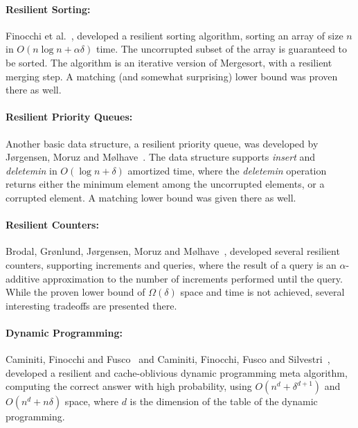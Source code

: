 \documentclass{llncs}
\begin{document}
\paragraph{Resilient Sorting:}

	Finocchi et al.~\cite{resilient_data_structures,resilient_sorting},
	developed a resilient sorting algorithm,
	sorting an array of size $n$ in $O(n\log n + \alpha\delta)$ time.
	The uncorrupted subset of the array is guaranteed to be sorted.
	The algorithm is an iterative version of Mergesort,
	with a resilient merging step.
	A matching (and somewhat surprising) lower bound
	was proven there as well.
	
\paragraph{Resilient Priority Queues:}

	Another basic data structure, a resilient priority queue,
	was developed by J{\o}rgensen, Moruz and M{\o}lhave~\cite{resilient_priority_queues}.
	The data structure supports \emph{insert} and \emph{deletemin} in $O(\log n + \delta)$ amortized time,
	where the \emph{deletemin} operation returns either the minimum element among the uncorrupted elements,
	or a corrupted element.
	A matching lower bound was given there as well.	
		
\paragraph{Resilient Counters:}

	Brodal, Gr{\o}nlund, J{\o}rgensen, Moruz and \linebreak M{\o}lhave~\cite{resilient_counters},
	developed several resilient counters,
	supporting increments and queries,
	where the result of a query is an $\alpha$-additive approximation
	to the number of increments performed until the query.
	While the proven lower bound of $\Omega(\delta)$ space and time
	is not achieved, several interesting tradeoffs are presented there.

\paragraph{Dynamic Programming:}	
	
	Caminiti, Finocchi and Fusco~\cite{first_dynamic_programming}
	and Caminiti, Finocchi, Fusco and Silvestri~\cite{dynamic_programming},
	developed a resilient and cache-oblivious dynamic programming meta algorithm,
	computing the correct answer with high probability,
	using $O(n^d + \delta^{d+1})$ and $O(n^d + n\delta)$ space,
	where $d$ is the dimension of the table of the dynamic programming.
\end{document}
